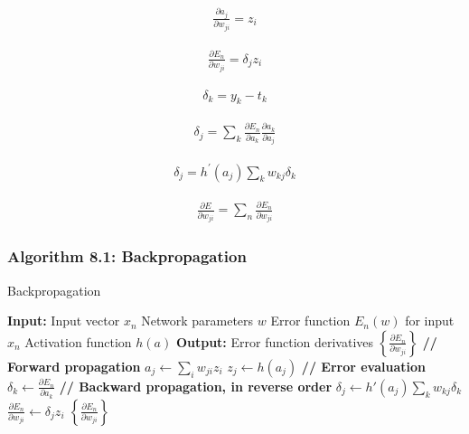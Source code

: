\documentclass{article}
\begin{document}
\begin{align*}
\frac{\partial a_{j}}{\partial w_{j i}} = z_{i} \tag{8.9}
\end{align*}

\begin{align*}
\frac{\partial E_{n}}{\partial w_{j i}} = \delta_{j} z_{i} \tag{8.10}
\end{align*}

\begin{align*}
\delta_{k} = y_{k} - t_{k} \tag{8.11}
\end{align*}

\begin{align*}
\delta_{j} = \sum_{k} \frac{\partial E_{n}}{\partial a_{k}} \frac{\partial a_{k}}{\partial a_{j}} \tag{8.12}
\end{align*}

\begin{align*}
\delta_{j} = h^{\prime}(a_{j}) \sum_{k} w_{k j} \delta_{k} \tag{8.13}
\end{align*}

\begin{align*}
\frac{\partial E}{\partial w_{j i}} = \sum_{n} \frac{\partial E_{n}}{\partial w_{j i}} \tag{8.14}
\end{align*}

\subsubsection{Algorithm 8.1: Backpropagation}

\begin{algorithm}
\caption{Backpropagation}
\begin{algorithmic}[1]
\STATE \textbf{Input:} Input vector $x_n$
\STATE \quad Network parameters $w$
\STATE \quad Error function $E_n(w)$ for input $x_n$
\STATE \quad Activation function $h(a)$
\STATE \textbf{Output:} Error function derivatives $\left\{\frac{\partial E_n}{\partial w_{ji}}\right\}$
\STATE \textbf{// Forward propagation}
    \STATE $a_j \gets \sum_i w_{ji} z_i$ 
    \STATE $z_j \gets h(a_j)$ 
\ENDFOR
\STATE \textbf{// Error evaluation}
    \STATE $\delta_k \gets \frac{\partial E_n}{\partial a_k}$ 
\ENDFOR
\STATE \textbf{// Backward propagation, in reverse order}
    \STATE $\delta_j \gets h'(a_j) \sum_k w_{kj} \delta_k$ 
    \STATE $\frac{\partial E_n}{\partial w_{ji}} \gets \delta_j z_i$ 
\ENDFOR
\RETURN $\left\{\frac{\partial E_n}{\partial w_{ji}}\right\}$
\end{algorithmic}
\end{algorithm}
\end{document}
